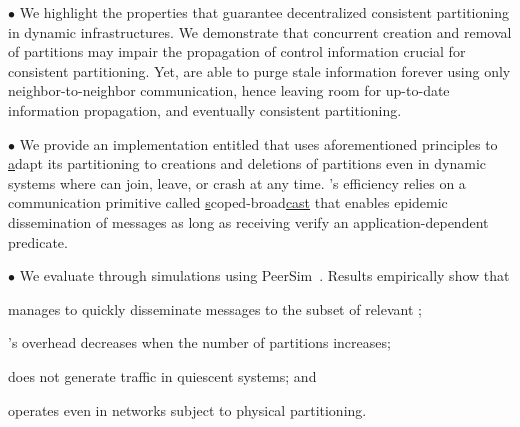 \begin{asparadesc} %
\item [$\bullet$] We highlight the properties that guarantee
  decentralized consistent partitioning in dynamic infrastructures. We
  demonstrate that concurrent creation and removal of partitions may
  impair the propagation of control information crucial for consistent
  partitioning. Yet, \processes are able to purge stale information
  forever using only neighbor-to-neighbor communication, hence leaving
  room for up-to-date information propagation, and eventually
  consistent partitioning.
  
\item [$\bullet$] We provide an implementation entitled \NAME that
  uses aforementioned principles to \underline{a}dapt its partitioning
  to creations and deletions of partitions even in dynamic systems
  where \nodes can join, leave, or crash at any time. \NAME's
  efficiency relies on a communication primitive called
  \underline{s}coped-broad\underline{cast}
   that enables epidemic
  dissemination of messages as long as receiving \processes verify an
  application-dependent predicate.
 
\item [$\bullet$] We evaluate \NAME through simulations using
  PeerSim~\cite{montresor2009peersim}. Results empirically show that
  \begin{inparaenum}[(i)]
  \item \NAME manages to quickly disseminate messages to the subset of
    relevant \processes;
  \item \NAME's overhead decreases when the number of partitions
    increases;
  \item \NAME does not generate traffic in quiescent systems; and
  \item \NAME operates even in networks subject
    to physical partitioning.
  \end{inparaenum}
\end{asparadesc}



